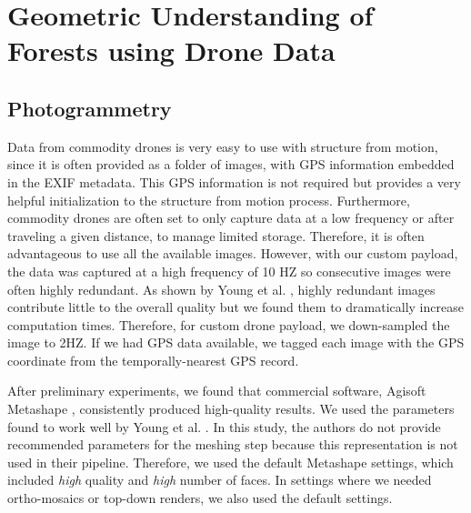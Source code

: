 %
%
%    

\section{Geometric Understanding of Forests using Drone Data}


\subsection{Photogrammetry}
Data from commodity drones is very easy to use with structure from motion, since it is often provided as a folder of images, with GPS information embedded in the EXIF metadata. This GPS information is not required but provides a very helpful initialization to the structure from motion process. Furthermore, commodity drones are often set to only capture data at a low frequency or after traveling a given distance, to manage limited storage. Therefore, it is often advantageous to use all the available images. However, with our custom payload, the data was captured at a high frequency of 10 HZ so consecutive images were often highly redundant. As shown by Young et al. \cite{Young2022}, highly redundant images contribute little to the overall quality but we found them to dramatically increase computation times. Therefore, for custom drone payload, we down-sampled the image to 2HZ. If we had GPS data available, we tagged each image with the GPS coordinate from the temporally-nearest GPS record.   

After preliminary experiments, we found that commercial software, Agisoft Metashape \cite{AgisoftMetashape}, consistently produced high-quality results. We used the parameters found to work well by Young et al. \cite{Young2022}. In this study, the authors do not provide recommended parameters for the meshing step because this representation is not used in their pipeline. Therefore, we used the default Metashape settings, which included \textit{high} quality and \textit{high} number of faces. In settings where we needed ortho-mosaics or top-down renders, we also used the default settings.


